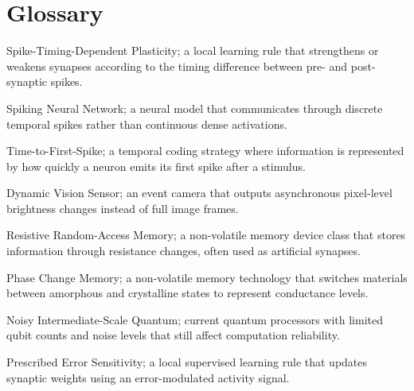 \documentclass[11pt]{article}
\begin{document}
\section*{Glossary}
\begin{description}[leftmargin=2.8cm,style=nextline,itemsep=0.3em]
    \item[STDP] Spike-Timing-Dependent Plasticity; a local learning rule that strengthens or weakens synapses according to the timing difference between pre- and post-synaptic spikes.
    \item[SNN] Spiking Neural Network; a neural model that communicates through discrete temporal spikes rather than continuous dense activations.
    \item[TTFS] Time-to-First-Spike; a temporal coding strategy where information is represented by how quickly a neuron emits its first spike after a stimulus.
    \item[DVS] Dynamic Vision Sensor; an event camera that outputs asynchronous pixel-level brightness changes instead of full image frames.
    \item[RRAM] Resistive Random-Access Memory; a non-volatile memory device class that stores information through resistance changes, often used as artificial synapses.
    \item[PCM] Phase Change Memory; a non-volatile memory technology that switches materials between amorphous and crystalline states to represent conductance levels.
    \item[NISQ] Noisy Intermediate-Scale Quantum; current quantum processors with limited qubit counts and noise levels that still affect computation reliability.
    \item[PES] Prescribed Error Sensitivity; a local supervised learning rule that updates synaptic weights using an error-modulated activity signal.
\end{description}

\newpage



\end{document}
